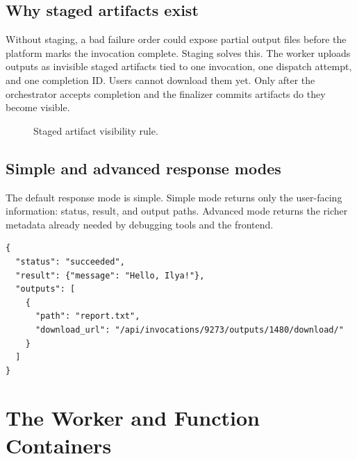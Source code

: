 \documentclass[12pt,a4paper]{report}
\begin{document}
\section{Why staged artifacts exist}

Without staging, a bad failure order could expose partial output files before
the platform marks the invocation complete. Staging solves this. The worker
uploads outputs as invisible staged artifacts tied to one invocation, one
dispatch attempt, and one completion ID. Users cannot download them yet. Only
after the orchestrator accepts completion and the finalizer commits artifacts
do they become visible.

\begin{figure}[h]
\centering
{}
\caption{Staged artifact visibility rule.}
\end{figure}

\section{Simple and advanced response modes}

The default response mode is simple. Simple mode returns only the user-facing
information: status, result, and output paths. Advanced mode returns the richer
metadata already needed by debugging tools and the frontend.

\begin{lstlisting}[caption={Simple terminal invocation response.}]
{
  "status": "succeeded",
  "result": {"message": "Hello, Ilya!"},
  "outputs": [
    {
      "path": "report.txt",
      "download_url": "/api/invocations/9273/outputs/1480/download/"
    }
  ]
}
\end{lstlisting}

\clearpage

\chapter{The Worker and Function Containers}
\end{document}
